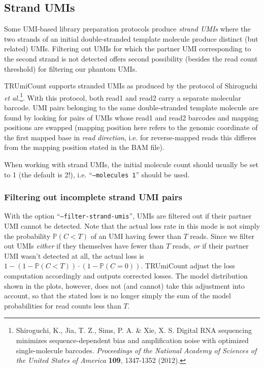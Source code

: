 \documentclass[10pt]{article}
\begin{document}
\pagebreak
\subsection{Strand UMIs}

Some UMI-based library preparation protocols produce \emph{strand UMIs} where the two strands of an initial double-stranded template molecule produce distinct (but related) UMIs. Filtering out UMIs for which the partner UMI corresponding to the second strand is not detected offers second possibility (besides the read count threshold) for filtering our phantom UMIs.

TRUmiCount supports stranded UMIs as produced by the protocol of Shiroguchi \textit{et al.}\footnote{Shiroguchi, K., Jia, T. Z., Sims, P. A. \& Xie, X. S. Digital RNA sequencing minimizes sequence-dependent bias and amplification noise with optimized single-molecule barcodes. \textit{Proceedings of the National Academy of Sciences of the United States of America} \textbf{109}, 1347-1352 (2012).}. With this protocol, both read1 and read2 carry a separate molecular barcode. UMI pairs belonging to the same double-stranded template molecule are found by looking for pairs of UMIs whose read1 and read2 barcodes and mapping positions are swapped (mapping position here refers to the genomic coordinate of the first mapped base in \emph{read direction}, i.e. for reverse-mapped reads this differes from the mapping position stated in the BAM file).

When working with strand UMIs, the initial molecule count should usually be set to 1 (the default is 2!), i.e. ``\texttt{--molecules 1}'' should be used.

\subsubsection*{Filtering out incomplete strand UMI pairs}

With the option ``\texttt{--filter-strand-umis}'', UMIs are filtered out if their partner UMI cannot be detected. Note that the actual loss rate in this mode is not simply the probability $\mathbb{P}(C < T)$ of an UMI having fewer than $T$ reads. Since we filter out UMIs \emph{either} if they themselves have fewer than $T$ reads, \emph{or} if their partner UMI wasn't detected at all, the actual loss is $1 - (1 - \mathbb{P}(C < T))\cdot (1 - \mathbb{P}(C=0))$. TRUmiCount adjust the loss computation accordingly and outputs corrected losses. The model distribution shown in the plots, however, does not (and cannot) take this adjustment into account, so that the stated loss is no longer simply the sum of the model probabilities for read counts less than $T$.
\end{document}

